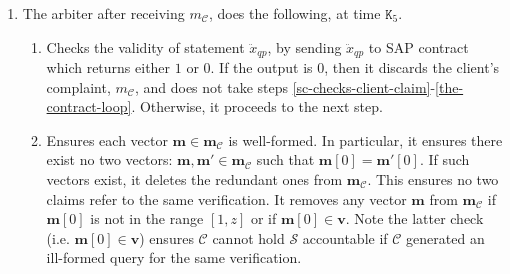 \begin{enumerate}
\begin{enumerate}


\item The arbiter after receiving $m_{\scriptscriptstyle\mathcal C}$, does the following, at time $\texttt{K}_{\scriptscriptstyle 5}$. 
\begin{enumerate}
\item Checks the validity of  statement $\ddot{x}_{\scriptscriptstyle qp}$, by   sending $\ddot{x}_{\scriptscriptstyle qp}$ to SAP contract which  returns  either $1$ or $0$. If the output is $0$, then it discards the client's complaint, ${m}_{\scriptscriptstyle\mathcal C}$, and does not take steps \ref{sc-checks-client-claim}-\ref{the-contract-loop}. Otherwise, it proceeds to the next step. 

 \item\label{sc-checks-client-claim} Ensures each vector   $ {\bm{m}}\in  {\bm{m}}_{\scriptscriptstyle\mathcal{C}}$ is well-formed. In particular, it ensures there exist no two vectors: $ {\bm{m}}, {\bm{m}}'\in  {\bm{m}}_{\scriptscriptstyle\mathcal{C}}$ such that $ {\bm{m}}[0]= {\bm{m}}'[0]$.  If such vectors  exist, it deletes the redundant ones from $ {\bm{m}}_{\scriptscriptstyle\mathcal{C}}$. This ensures no two claims refer to the same verification.  It removes any vector $ {\bm{m}}$ from $ {\bm{m}}_{\scriptscriptstyle\mathcal{C}}$ if $ {\bm{m}}[0]$ is not in the range $[1,z]$ or if $ {\bm{m}}[0]\in  {\bm{v}}$. Note the latter check  (i.e. $ {\bm{m}}[0]\in  {\bm{v}}$) ensures $\mathcal C$ cannot hold $\mathcal S$ accountable if $\mathcal C$  generated an ill-formed query for the same verification.   



\end{enumerate}
\end{enumerate}
\end{enumerate}
